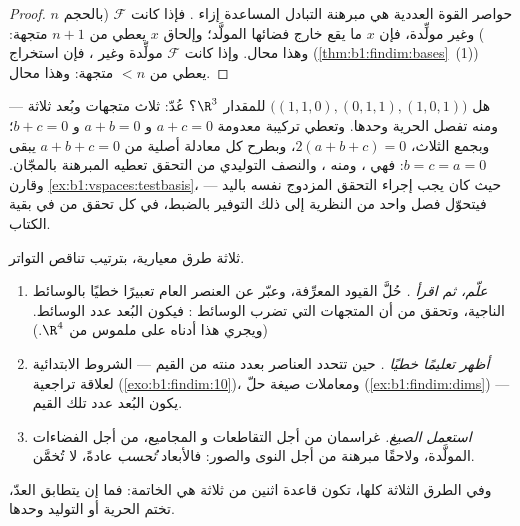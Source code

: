 \begin{proof}
حواصر القوة العددية هي مبرهنة التبادل المساعدة إزاء . فإذا كانت
$\mathcal{F}$ (بالحجم $n$)  وغير مولِّدة، فإن $x$ ما يقع
خارج فضائها المولَّد؛ وإلحاق $x$ يعطي  من $n + 1$
متجهة: وهذا محال. وإذا كانت $\mathcal{F}$ مولِّدة وغير ، فإن
استخراج  (\cref{thm:b1:findim:bases}~(1)) يعطي  من
$< n$ متجهة: وهذا محال.
\end{proof}

\begin{example}
\label{ex:b1:findim:twoofthreerun}
هل $\bigl((1,1,0), (0,1,1), (1,0,1)\bigr)$  للمقدار $\R^3$؟
عُدّ: ثلاث متجهات وبُعد ثلاثة --- ومنه تفصل الحرية
وحدها. وتعطي تركيبة معدومة $a + c = 0$ و $a + b = 0$ و $b +
c = 0$؛ وبجمع الثلاث، $2(a + b + c) = 0$، وبطرح
كل معادلة أصلية من $a + b + c = 0$ يبقى $b = c = a =
0$: فهي ، ومنه ، والنصف التوليدي من
التحقق تعطيه المبرهنة بالمجّان. وقارن
\cref{ex:b1:vspaces:testbasis}، حيث كان يجب إجراء التحقق
المزدوج نفسه باليد --- فيتحوّل فصل واحد من النظرية
إلى ذلك التوفير بالضبط، في كل تحقق من  في
بقية الكتاب.
\end{example}

\begin{method}[حساب بُعد]
\label{met:b1:findim:computedim}
ثلاثة طرق معيارية، بترتيب تناقص التواتر.
\begin{enumerate}
  \item \emph{علّم، ثم اقرأ .} حُلَّ القيود
        المعرِّفة، وعبّر عن العنصر العام
        تعبيرًا خطيًا بالوسائط الناجية، وتحقق من أن
        المتجهات التي تضرب الوسائط : فيكون
        البُعد عدد الوسائط. (ويجري هذا أدناه على  ملموس من $\R^4$.)
  \item \emph{أظهر تعليمًا خطيًا .} حين
        تتحدد العناصر بعدد منته من القيم ---
        الشروط الابتدائية لعلاقة تراجعية
        (\cref{exo:b1:findim:10})، ومعاملات صيغة حلّ
        (\cref{ex:b1:findim:dims}) --- يكون البُعد
        عدد تلك القيم.
  \item \emph{استعمل الصيغ.} غراسمان من أجل التقاطعات و
        المجاميع،  من أجل الفضاءات المولَّدة، ولاحقًا مبرهنة 
        من أجل النوى والصور: فالأبعاد \emph{تُحسب}
        عادةً، لا تُخمَّن.
\end{enumerate}
وفي الطرق الثلاثة كلها، تكون قاعدة اثنين من ثلاثة هي الخاتمة:
فما إن يتطابق العدّ، تختم الحرية أو التوليد وحدها.
\end{method}


